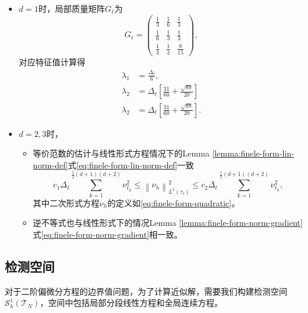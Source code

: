 \begin{itemize}
  \item $d=1$时，局部质量矩阵$G_{\ell}$为
  \begin{equation*}
    G_{\ell} =
    \begin{pmatrix}
      \frac{1}{3} & \frac{1}{6} & \frac{1}{3} \\
      \frac{1}{6} & \frac{1}{3} & \frac{1}{3} \\
      \frac{1}{3} & \frac{1}{3} & \frac{8}{15}
    \end{pmatrix},
  \end{equation*}
  对应特征值计算得
  \begin{equation*}
    \begin{split}
      \lambda_{1} &= \frac{\Delta_{\ell}}{6}, \\
      \lambda_{2} &= \Delta_{\ell} \left[ \frac{31}{60} + \frac{\sqrt{89}}{20} \right] \\
      \lambda_{2} &= \Delta_{\ell} \left[ \frac{31}{60} + \frac{\sqrt{89}}{20} \right].
    \end{split}
  \end{equation*}
  \item $d=2,3$时，
  \begin{itemize}
    \item 等价范数的估计与线性形式方程情况下的Lemma \ref{lemma:finele-form-lin-norm-def}式\eqref{eq:finele-form-lin-norm-def}一致
    \begin{equation}
      \label{eq:finele-form-quadratic-norm-def}
      c_{1} \Delta_{\ell} \sum_{k=1}^{\frac{1}{2}\left( d+1 \right)\left( d+2 \right)}
      \nu_{\ell_{k}}^{2}
      \le \left\| \nu_{h} \right\|_{L^{2}(\tau_{\ell})}^{2}
      \le c_{2} \Delta_{\ell} \sum_{k=1}^{\frac{1}{2}\left( d+1 \right)\left( d+2 \right)}
      \nu_{\ell_{k}}^{2},
    \end{equation}
    其中二次形式方程$\nu_{h}$的定义如\eqref{eq:finele-form-quadratic}。
    \item 逆不等式也与线性形式下的情况Lemma \ref{lemma:finele-form-norm-gradient}式\eqref{eq:finele-form-norm-gradient}相一致。
  \end{itemize}
\end{itemize}


\subsection{检测空间}
\label{sec:finele-trial}
对于二阶偏微分方程的边界值问题，为了计算近似解，需要我们构建检测空间$\mathcal{S}_{h}^{1}\left(\mathcal{T}_{N} \right)$，空间中包括局部分段线性方程和全局连续方程。

